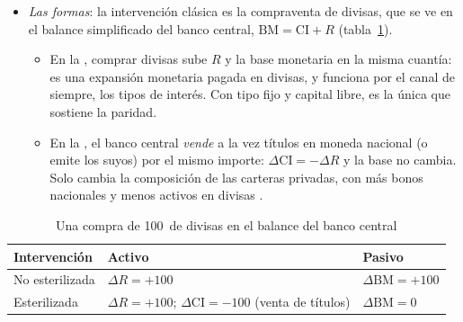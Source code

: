 \documentclass[11pt]{article}
\begin{document}
\begin{itemize}
\item \emph{Las formas}: la intervención clásica es la compraventa de divisas, que se ve en el balance simplificado del banco central, $\mathrm{BM}=\mathrm{CI}+R$ (tabla~\ref{tab:balance-intervencion}).
  \begin{itemize}
  \item En la , comprar divisas sube $R$ y la base monetaria en la misma cuantía: es una expansión monetaria pagada en divisas, y funciona por el canal de siempre, los tipos de interés. Con tipo fijo y capital libre, es la única que sostiene la paridad.
  \item En la , el banco central \emph{vende} a la vez títulos en moneda nacional (o emite los suyos) por el mismo importe: $\Delta\mathrm{CI}=-\Delta R$ y la base no cambia. Solo cambia la composición de las carteras privadas, con más bonos nacionales y menos activos en divisas .
  \end{itemize}
\end{itemize}

\begin{table}[H]
\centering
\caption{Una compra de 100~de divisas en el balance del banco central}\label{tab:balance-intervencion}
\small
\begin{tabular}{>{\raggedright\arraybackslash}m{3.4cm}>{\centering\arraybackslash}m{4.4cm}>{\centering\arraybackslash}m{3.4cm}}
\toprule
\rowcolor{tceeazulpalido}\textbf{Intervención} & \textbf{Activo} & \textbf{Pasivo}\\
\midrule
No esterilizada & $\Delta R=+100$ & \textcolor{tceerojo}{$\Delta\mathrm{BM}=+100$}\\
Esterilizada & $\Delta R=+100$; $\Delta\mathrm{CI}=-100$ (venta de títulos) & \textcolor{tceeverde}{$\Delta\mathrm{BM}=0$}\\
\bottomrule
\end{tabular}
\end{table}
\end{document}
